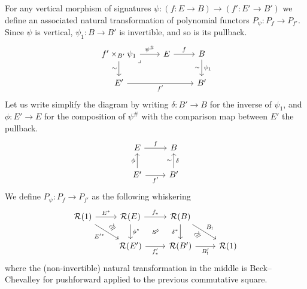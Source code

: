 \begin{definition}\label{def:vert-trans}
  For any vertical morphism of signatures
  $\psi : (f : E \to B) \to (f' : E' \to B')$
  we define an associated natural transformation of polynomial functors
  $P_\psi : P_f \to P_{f'}$.
  Since $\psi$ is vertical,
  $\psi_1 : B \to B'$ is invertible,
  and so is its pullback.
  \[
  \begin{tikzcd}
    {f' \times_{B'} \psi_1} & E & B \\
    {E'} && {B'}
    \arrow["{{\psi^\#}}", from=1-1, to=1-2]
    \arrow["\sim"', from=1-1, to=2-1]
    \arrow["\lrcorner"{anchor=center, pos=0.0125}, draw=none, from=1-1, to=2-3]
    \arrow["f", from=1-2, to=1-3]
    \arrow["{{\psi_1}}", from=1-3, to=2-3]
    \arrow["\sim"', draw=none, from=1-3, to=2-3]
    \arrow["{{f'}}"', from=2-1, to=2-3]
  \end{tikzcd}
  \]
  Let us write simplify the diagram by writing $\delta : B' \to B$ for the inverse of $\psi_1$,
  and $\phi : E' \to E$ for the composition of $\psi^\#$ with the comparison map between $E'$ the pullback.
  \[
  \begin{tikzcd}
    {E} & {B} \\
    E' & B'
    \arrow["{f}", from=1-1, to=1-2]
    \arrow["\phi", from=2-1, to=1-1]
    \arrow["\delta"', from=2-2, to=1-2]
    \arrow["\sim"', draw=none, from=1-2, to=2-2]
    \arrow["{f'}"', from=2-1, to=2-2]
  \end{tikzcd}
  \]
  We define $P_\psi: P_f \to P_{f'}$ as the following whiskering 
  \[\begin{tikzcd}
    \RR(1) & {\RR(E)} & {\RR(B)} \\
    & {\RR(E')} & {\RR(B')} & \RR(1)
    \arrow["{E^*}", from=1-1, to=1-2]
    \arrow[""{name=0, anchor=center, inner sep=0}, "{E'^*}"', from=1-1, to=2-2]
    \arrow["{f_*}", from=1-2, to=1-3]
    \arrow["{\phi^*}", from=1-2, to=2-2]
    \arrow["\Rightarrow"{marking, allow upside down}, draw=none, from=1-3, to=2-2]
    \arrow["{\delta^*}"', from=1-3, to=2-3]
    \arrow[""{name=1, anchor=center, inner sep=0}, "{B_!}", from=1-3, to=2-4]
    \arrow["{f'_*}"', from=2-2, to=2-3]
    \arrow["{B'_!}"', from=2-3, to=2-4]
    \arrow["\iso"{marking, allow upside down}, draw=none, from=0, to=1-2]    
    \arrow["{\iso}"{marking, allow upside down}, draw=none, from=2-3, to=1]
  \end{tikzcd}\]
  where the (non-invertible) natural transformation in the middle is
  Beck--Chevalley for pushforward applied to the previous commutative square.
\end{definition}

